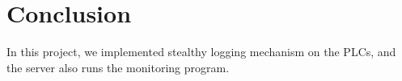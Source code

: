 
\section{Conclusion}

In this project, we implemented stealthy logging mechanism on the PLCs, and the server also runs the monitoring program. 